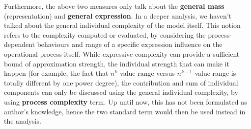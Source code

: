 Furthermore, the above two measures only talk about the \textbf{general mass} (representation) and \textbf{general expression}. In a deeper analysis, we haven't talked about the general individual complexity of the model itself. This notion refers to the complexity computed or evaluated, by considering the process-dependent behaviours and range of a specific expression influence on the operational process itself. While expressive complexity can provide a sufficient bound of approximation strength, the individual strength that can make it happen (for example, the fact that $n^{k}$ value range versus $n^{k-1}$ value range is totally different by one power degree), the contribution and sum of individual components can only be discussed using the general individual complexity, by using \textbf{process complexity} term. Up until now, this has not been formulated as author's knowledge, hence the two standard term would then be used instead in the analysis. 

